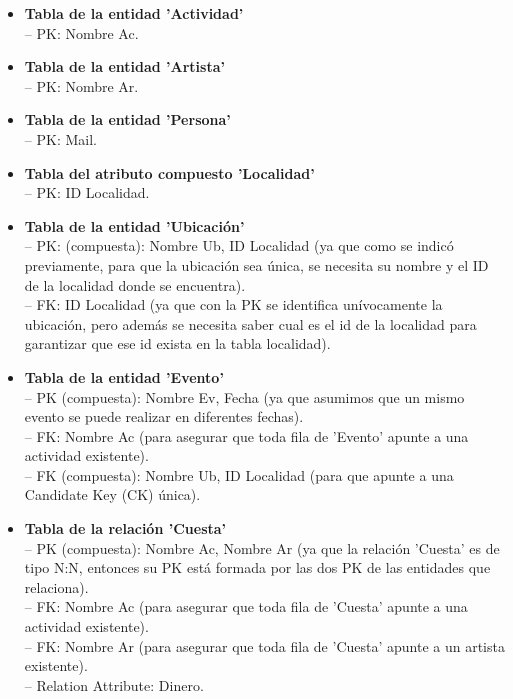 \documentclass[12pt]{article}
\begin{document}
    \begin{itemize}

        \item \textbf{Tabla de la entidad 'Actividad'} \\
            -- PK: Nombre Ac.
        
        \item \textbf{Tabla de la entidad 'Artista'} \\
            -- PK: Nombre Ar.
            
        \item \textbf{Tabla de la entidad 'Persona'} \\
            -- PK: Mail.
            
        \item \textbf{Tabla del atributo compuesto 'Localidad'} \\
            -- PK: ID Localidad.

        \item \textbf{Tabla de la entidad 'Ubicación'} \\
            -- PK: (compuesta): Nombre Ub, ID Localidad (ya que como se indicó previamente, para que la ubicación sea única, se necesita su nombre y 
            el ID de la localidad donde se encuentra). \\
            -- FK: ID Localidad (ya que con la PK se identifica unívocamente la ubicación, pero además se necesita saber cual es el id de la localidad 
            para garantizar que ese id exista en la tabla localidad).

        \item \textbf{Tabla de la entidad 'Evento'} \\
            -- PK (compuesta): Nombre Ev, Fecha (ya que asumimos que un mismo evento se puede realizar en diferentes fechas). \\
            -- FK: Nombre Ac (para asegurar que toda fila de 'Evento' apunte a una actividad existente). \\
            -- FK (compuesta): Nombre Ub, ID Localidad (para que apunte a una Candidate Key (CK) única).
            
        \item \textbf{Tabla de la relación 'Cuesta'} \\
            -- PK (compuesta): Nombre Ac, Nombre Ar (ya que la relación 'Cuesta' es de tipo N:N, entonces su PK está formada por las dos PK de las 
            entidades que relaciona). \\
            -- FK: Nombre Ac (para asegurar que toda fila de 'Cuesta' apunte a una actividad existente). \\
            -- FK: Nombre Ar (para asegurar que toda fila de 'Cuesta' apunte a un artista existente). \\
            -- Relation Attribute: Dinero.
            

\end{itemize}
\end{document}
